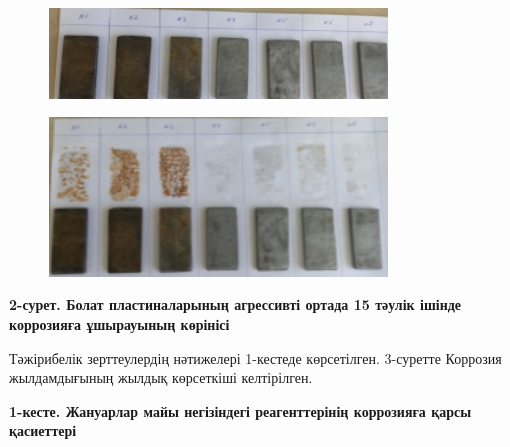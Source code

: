 \begin{figure}[H]
	\centering
	\includegraphics[width=0.8\textwidth]{media/gor/image25}
	\caption*{}
\end{figure}


\begin{figure}[H]
	\centering
	\includegraphics[width=0.8\textwidth]{media/gor/image26}
	\caption*{}
\end{figure}


{\bfseries 2-сурет. Болат пластиналарының агрессивті ортада 15 тәулік
ішінде коррозияға ұшырауының көрінісі}

Тәжірибелік зерттеулердің нәтижелері 1-кестеде көрсетілген. 3-суретте
Коррозия жылдамдығының жылдық көрсеткіші келтірілген.

{\bfseries 1-кесте. Жануарлар майы негізіндегі реагенттерінің коррозияға
қарсы қасиеттері}

